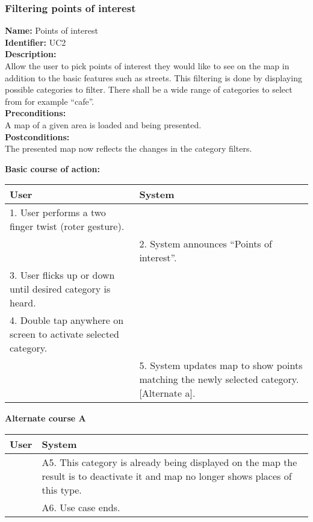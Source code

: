\documentclass[11pt,twoside,a4paper]{article}
\begin{document}
\subsubsection{Filtering points of interest}
\noindent
\textbf{Name:} Points of interest\\
\textbf{Identifier:} UC2\\
\textbf{Description:}\\
Allow the user to pick points of interest they would like to see on the
map in addition to the basic features such as streets. This filtering is
done by displaying possible categories to filter. There shall be a wide
range of categories to select from for example ``cafe''.\\
\textbf{Preconditions:}\\
A map of a given area is loaded and being presented.\\
\textbf{Postconditions:}\\
The presented map now reflects the changes in the category filters.

\noindent
\textbf{Basic course of action:}\\
\begin{tabularx}{\textwidth}{ |X|X| }
  \textbf{User} & \textbf{System}\\
  \hline
  1. User performs a two finger twist (roter gesture). & \\
  \hline
  & 2. System announces ``Points of interest''.\\
  \hline
  3. User flicks up or down until desired category is heard. & \\
  \hline
  4. Double tap anywhere on screen to activate selected
  category. & \\
  \hline
  & 5. System updates map to show points matching the newly selected
  category. [Alternate a].\\
  \hline
\end{tabularx}

\noindent
\textbf{Alternate course A}\\
\begin{tabularx}{\textwidth}{ |X|X| }
  \textbf{User} & \textbf{System}\\
  \hline
  & A5. This category is already being displayed on the map the result
  is to deactivate it and map no longer shows places of this type.\\
  \hline
  & A6. Use case ends.\\
  \hline
\end{tabularx}
\end{document}
